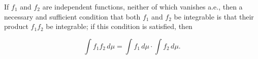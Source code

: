 If $f_1$ and $f_2$ are independent functions, neither of which vanishes a.e., then a necessary and sufficient condition that both $f_1$ and $f_2$ be integrable is that their product $f_1 f_2$ be integrable; if this condition is satisfied, then

$$\int f_1 f_2 \, d\mu = \int f_1 \, d\mu \cdot \int f_2 \, d\mu.$$
